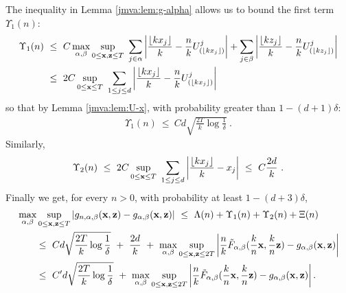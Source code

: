 \noindent
The inequality in Lemma \ref{jmva:lem:g-alpha} allows us to bound the first term $\Upsilon_1(n)$:
\begin{align*}
\Upsilon_1(n) &~\le~ C  \max_{\alpha, \beta} \sup_{ 0 \le \mathbf x, \mathbf z \le T }~
\sum_{j \in \alpha} \left| \frac{\lfloor kx_j\rfloor }{k} - \frac{n}{k} U_{(\lfloor kx_j\rfloor )}^j \right| + \sum_{j \in \beta} \left| \frac{\lfloor kz_j\rfloor }{k} - \frac{n}{k} U_{(\lfloor kz_j\rfloor )}^j \right|\\
&~\le~  2 C \sup_{ 0 \le \mathbf x \le T }~
\sum_{1 \le j \le d} \left| \frac{\lfloor kx_j\rfloor }{k} - \frac{n}{k} U_{(\lfloor kx_j\rfloor )}^j \right|
\end{align*}
\noindent
so that by Lemma \ref{jmva:lem:U-x}, with probability greater than $1-(d+1)\delta$:
\begin{align*}
\Upsilon_1(n) ~\le~ Cd \sqrt{\frac{2 T}{k}\log{\frac{1}{\delta}}}~.
\end{align*}
\noindent
Similarly, $$\Upsilon_2(n) ~\le~  2C \sup_{0 \le \mathbf x \le T }~
\sum_{1\le j \le d} \left|\frac{\lfloor k x_j\rfloor }{k} - x_j\right| ~\le~C \frac{2d}{k} ~. $$ 
Finally we get, for every $n >0$, with probability at least $1- (d+3)\delta$, 
\begin{align*}
& \max_{\alpha, \beta}  \sup_{ 0 \le \mathbf x, \mathbf z \le T }
 \left| g_{n, \alpha, \beta}(\mathbf x, \mathbf z) - g_{\alpha, \beta}(\mathbf x, \mathbf z) \right| ~\le~ \Lambda(n) + \Upsilon_1(n) + \Upsilon_2(n) + \Xi(n)
\\ &~~~~~~\le~  Cd\sqrt{\frac{2T}{k}\log\frac{1}{\delta}} ~+~ \frac{2d}{k} 
~+~  \max_{\alpha, \beta} \sup_{ 0 \le \mathbf x, \mathbf z \le 2T}  \left|\frac{n}{k} \tilde F_{\alpha, \beta}(\frac{k}{n} \mathbf x , \frac{k}{n} \mathbf z)- g_{\alpha, \beta} (\mathbf{x}, \mathbf{z})\right|
\\ &~~~~~~\le~ C'd\sqrt{\frac{2T}{k}\log\frac{1}{\delta}} ~+~ 
  \max_{\alpha, \beta} \sup_{0 \le \mathbf x, \mathbf z \le 2T}
 \left|\frac{n}{k} \tilde F_{\alpha, \beta}(\frac{k}{n} \mathbf x , \frac{k}{n} \mathbf z)- g_{\alpha, \beta} (\mathbf{x}, \mathbf{z})\right|.
\end{align*}


